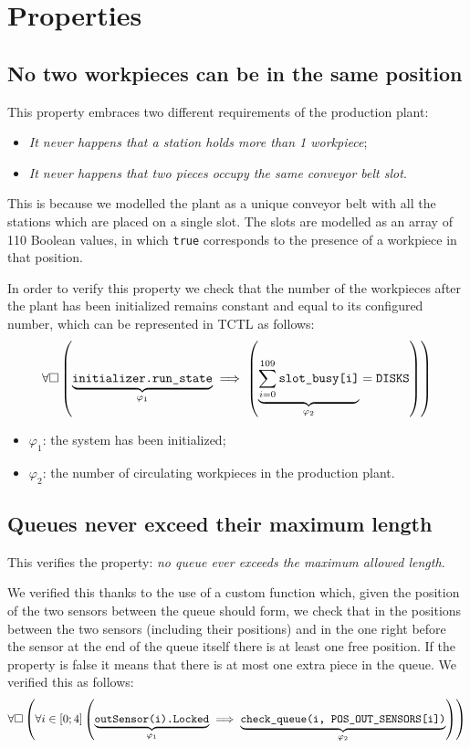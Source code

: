 \documentclass[a4paper]{article}
\newcommand{\formulacomment}[2]{\underset{\varphi_{#1}}{\underbrace{#2}}}
\newcommand{\formulatext}[1]{\text{\texttt{#1}}}
\begin{document}
    \section{Properties}

    \subsection{No two workpieces can be in the same position}

    This property embraces two different requirements of the production plant:
    \begin{itemize}
        \item \textit{It never happens that a station holds more than 1 workpiece};
        \item \textit{It never happens that two pieces occupy the same conveyor belt slot}.
    \end{itemize}

    This is because we modelled the plant as a unique conveyor belt with all the stations which are placed on a single slot. The slots are modelled as an array of 110 Boolean values, in which \texttt{true} corresponds to the presence of a workpiece in that position.\medskip

    In order to verify this property we check that the number of the workpieces after the plant has been initialized remains constant and equal to its configured number, which can be represented in TCTL as follows:
    \[\forall \square \left(\formulacomment{1}{\formulatext{initializer.run\_state}} \implies \left(\formulacomment{2}{\sum_{i = 0}^{109} \formulatext{slot\_busy[i]}} = \formulatext{DISKS}\right)\right)\]

    \begin{itemize}
        \item \(\varphi_1\): the system has been initialized;
        \item \(\varphi_2\): the number of circulating workpieces in the production plant.
    \end{itemize}

    \subsection{Queues never exceed their maximum length}

    This verifies the property: \textit{no queue ever exceeds the maximum allowed length}.\medskip

    We verified this thanks to the use of a custom function which, given the position of the two sensors between the queue should form, we check that in the positions between the two sensors (including their positions) and in the one right before the sensor at the end of the queue itself there is at least one free position. If the property is false it means that there is at most one extra piece in the queue. We verified this as follows:
    \[\forall \square \left(\forall i \in \left[0; 4\right] \left(\formulacomment{1}{\formulatext{outSensor(i).Locked}} \implies \formulacomment{2}{\formulatext{check\_queue(i, POS\_OUT\_SENSORS[i])}}\right)\right)\]
\end{document}
